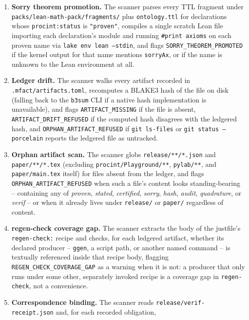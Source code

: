 \begin{enumerate}
\item \textbf{Sorry theorem promotion.} The scanner parses every TTL
  fragment under \texttt{packs/lean-math-pack/fragments/} plus
  \texttt{ontology.ttl} for declarations whose \texttt{procint:status} is
  \texttt{"proven"}, compiles a single scratch Lean file importing each
  declaration's module and running \texttt{\#print axioms} on each
  proven name via \texttt{lake env lean --stdin}, and flags
  \texttt{SORRY\_THEOREM\_PROMOTED} if the kernel output for that name
  mentions \texttt{sorryAx}, or if the name is unknown to the Lean
  environment at all.
\item \textbf{Ledger drift.} The scanner walks every artifact recorded
  in \texttt{.mfact/artifacts.toml}, recomputes a BLAKE3 hash of the file
  on disk (falling back to the \texttt{b3sum} CLI if a native hash
  implementation is unavailable), and flags \texttt{ARTIFACT\_MISSING} if
  the file is absent, \texttt{ARTIFACT\_DRIFT\_REFUSED} if the computed
  hash disagrees with the ledgered hash, and \texttt{ORPHAN\_ARTIFACT\_REFUSED}
  if \texttt{git ls-files} or \texttt{git status --porcelain} reports the
  ledgered file as untracked.
\item \textbf{Orphan artifact scan.} The scanner globs
  \texttt{release/**/*.json} and \texttt{paper/**/*.tex} (excluding
  \texttt{procint/Playground/**}, \texttt{pylab/**}, and
  \texttt{paper/main.tex} itself) for files absent from the ledger, and
  flags \texttt{ORPHAN\_ARTIFACT\_REFUSED} when such a file's content
  looks standing-bearing -- containing any of \emph{proven}, \emph{stated},
  \emph{certified}, \emph{sorry}, \emph{hash}, \emph{audit},
  \emph{quadrature}, or \emph{verif} -- or when it already lives under
  \texttt{release/} or \texttt{paper/} regardless of content.
\item \textbf{regen-check coverage gap.} The scanner extracts the body of
  the justfile's \texttt{regen-check:} recipe and checks, for each
  ledgered artifact, whether its declared producer -- \texttt{ggen}, a
  script path, or another named command -- is textually referenced
  inside that recipe body, flagging \texttt{REGEN\_CHECK\_COVERAGE\_GAP}
  as a warning when it is not: a producer that only runs under some
  other, separately invoked recipe is a coverage gap in
  \texttt{regen-check}, not a convenience.
\item \textbf{Correspondence binding.} The scanner reads
  \texttt{release/verif-receipt.json} and, for each recorded obligation,

\end{enumerate}
